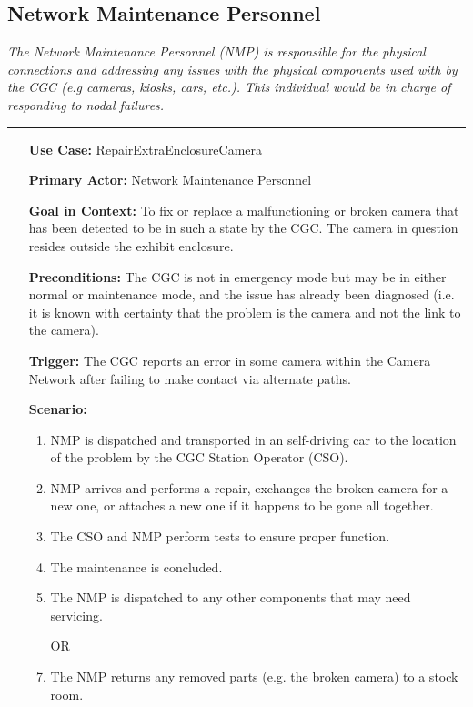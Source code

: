 \documentclass[12pt]{article}
\begin{document}
    \subsection{Network Maintenance Personnel}
    \textit{The Network Maintenance Personnel (NMP) is responsible for the physical connections 
    and addressing any issues with the physical components used with by the CGC (e.g cameras, 
    kiosks, cars, etc.). This individual would be in charge of responding to nodal failures.}
    \par\noindent\rule{\textwidth}{0.4pt}    
    \begin{itemize}
        \item[]\textbf{Use Case:}                                
            RepairExtraEnclosureCamera

        \item[]\textbf{Primary Actor:}
            Network Maintenance Personnel

        \item[]\textbf{Goal in Context:}
            To fix or replace a malfunctioning or broken camera that has been detected to
            be in such a state by the CGC. The camera in question resides outside the exhibit
            enclosure.

        \item[]\textbf{Preconditions:}
            The CGC is not in emergency mode but may be in either normal or maintenance mode, and
            the issue has already been diagnosed (i.e. it is known with certainty that the problem
            is the camera and not the link to the camera).

        \item[]\textbf{Trigger:}
            The CGC reports an error in some camera within the Camera Network after 
            failing to make contact via alternate paths.

        \item[]\textbf{Scenario:}
            \begin{enumerate}
                \item NMP is dispatched and transported in an self-driving car to the 
                location of the problem by the CGC Station Operator (CSO).
                \item NMP arrives and performs a repair, exchanges the broken camera
                for a new one, or attaches a new one if it happens to be gone all together.
                \item The CSO and NMP perform tests to ensure proper function.
                \item The maintenance is concluded.
                \item The NMP is dispatched to any other components that may need servicing.
                \item [OR]
                \item The NMP returns any removed parts (e.g. the broken camera) to a stock room.
            \end{enumerate}


\end{itemize}
\end{document}
